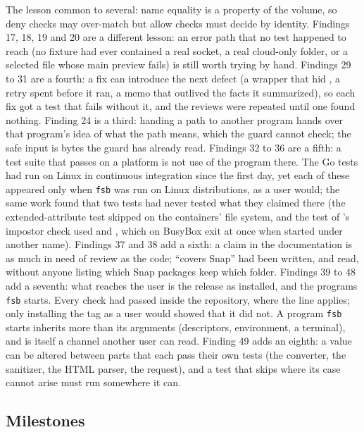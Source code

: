 The lesson common to several: name equality is a property of the volume, so deny checks may over-match but
allow checks must decide by identity.  Findings 17, 18, 19 and 20 are a different lesson: an error path that
no test happened to reach (no fixture had ever contained a real socket, a real cloud-only folder, or a
selected file whose main preview fails) is still worth trying by hand.  Findings 29 to 31 are a fourth: a fix can introduce the next defect (a wrapper that hid
, a retry spent before it ran, a memo that outlived the facts it summarized), so each
fix got a test that fails without it, and the reviews were repeated until one found nothing.  Finding 24 is a third: handing a
path to another program hands over that program's idea of what the path means, which the guard cannot
check; the safe input is bytes the guard has already read.  Findings 32 to 36 are a fifth: a test suite that
passes on a platform is not use of the program there.  The Go tests had run on Linux in continuous
integration since the first day, yet each of these appeared only when \texttt{fsb} was run on Linux
distributions, as a user would; the same work found that two tests had never tested what they
claimed there (the extended-attribute test skipped on the containers' file system, and the test of
's impostor check used  and , which on BusyBox exit at once when
started under another name).  Findings 37 and 38 add a sixth: a claim in the
documentation is as much in need of review as the code; ``covers Snap'' had been written,
and read, without anyone listing which Snap packages keep which folder.  Findings 39 to 48
add a seventh: what reaches the user is the release as installed, and the programs
\texttt{fsb} starts.  Every check had passed inside the repository, where the
 line applies; only installing the tag as a user would showed that it
did not.  A program \texttt{fsb} starts inherits more than its arguments (descriptors,
environment, a terminal), and is itself a channel another user can read.  Finding 49
adds an eighth: a value can be altered between parts that each pass their own tests (the
converter, the sanitizer, the HTML parser, the request), and a test that skips where its
case cannot arise must run somewhere it can.

\subsection{Milestones}

